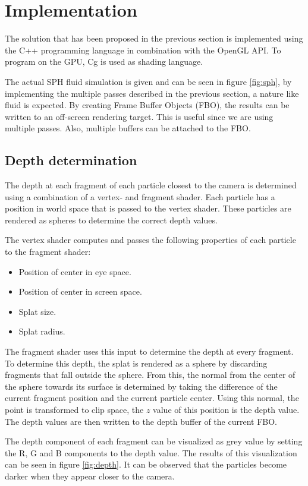 \section{Implementation}
\label{sec:impl}
The solution that has been proposed in the previous section is implemented using the C++ programming language in combination with the OpenGL API.
To program on the GPU, Cg is used as shading language.

The actual SPH fluid simulation is given and can be seen in figure \ref{fig:sph}, by implementing the multiple passes described in the previous section, a nature like fluid is expected.
By creating Frame Buffer Objects (FBO), the results can be written to an off-screen rendering target.
This is useful since we are using multiple passes.
Also, multiple buffers can be attached to the FBO.

\subsection{Depth determination}
The depth at each fragment of each particle closest to the camera is determined using a combination of a vertex- and fragment shader.
Each particle has a position in world space that is passed to the vertex shader.
These particles are rendered as spheres to determine the correct depth values.

The vertex shader computes and passes the following properties of each particle to the fragment shader:
\begin{itemize}
 	\item Position of center in eye space.
 	\item Position of center in screen space.
 	\item Splat size.
 	\item Splat radius.
 \end{itemize} 

The fragment shader uses this input to determine the depth at every fragment.
To determine this depth, the splat is rendered as a sphere by discarding fragments that fall outside the sphere.
From this, the normal from the center of the sphere towards its surface is determined by taking the difference of the current fragment position and the current particle center.
Using this normal, the point is transformed to clip space, the $z$ value of this position is the depth value.
The depth values are then written to the depth buffer of the current FBO.

The depth component of each fragment can be visualized as grey value by setting the R, G and B components to the depth value.
The results of this visualization can be seen in figure \ref{fig:depth}.
It can be observed that the particles become darker when they appear  closer to the camera.

